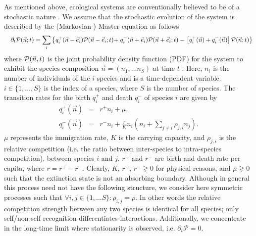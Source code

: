 \documentclass[9pt,lineno]{elife}
\begin{document}


As mentioned above, ecological systems are conventionally believed to be of a stochastic nature \cite{black2012stochastic}. 
We assume that the stochastic evolution of the system is described by the (Markovian-) Master equation as follows
\begin{eqnarray}
&& \partial_t  
{\rm \mathcal{P}}(\vec{n};t)= \label{master-eq}
\sum_{i}\left\{q^+_i (\vec{n}-\vec{e}_i){\rm \mathcal{P}}(\vec{n}-\vec{e}_i;t)+ \right.
q^-_i (\vec{n}+\vec{e}_i){\rm \mathcal{P}}(\vec{n}+\vec{e}_i;t)-  \left. \left[q^+_i(\vec{n})+q^-_i(\vec{n})\right]{\rm \mathcal{P}}(\vec{n};t)
\right\}    
\end{eqnarray}
where ${\rm \mathcal{P}}(\vec{n},t)$ is the joint probability density function (PDF) for the system to exhibit the species composition $\vec{n}=(n_1,\dots n_S)$ at time $t$ \cite{gardiner1985handbook}.
Here, $n_i$ is the number of individuals of the $i$ species and is a time-dependent variable. 
$i\in \{1,\dots,S\}$ is the index of a species, where $S$ is the number of species. 
The transition rates for the birth $q^+_i$ and death $q^-_i$ of species $i$ are given by 
\begin{eqnarray}
q_i^+(\vec{n})&=&r^+ n_i +\mu,  \\
q_i^-(\vec{n})&=&r^- n_i + \frac{r}{K} n_i \left(n_i +\sum_{j\neq i} \rho _{j,i} n_j\right). \nonumber
\end{eqnarray}
$\mu$ represents the immigration rate, $K$ is the carrying capacity, and $\rho_{j,i}$ is the relative competition (i.e. the ratio between inter-species to intra-species competition), between species $i$ and $j$. $r^+$ and $r^-$ are birth and death rate per capita, where $r=r^+-r^-$. 
Clearly, $K$, $r^+$, $r^-\gneq
0$ for physical reasons, and $\mu\gneq 0$ such that the extinction state is not an absorbing boundary.    
Although in general this process need not have the following structure, we consider here symmetric processes such that $\forall i,j\in \{1,\dots S\}:\rho_{i,j}=\rho$.
In other words the relative competition strength between any two species is identical for all species; only self/non-self recognition differentiates interactions. Additionally, we concentrate in the long-time limit where stationarity is observed, i.e. $\partial_t \mathcal{P}=0$.
\end{document}
